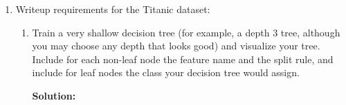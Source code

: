 \documentclass{article}
\newcommand{\solution}{\textbf{Solution: }}
\begin{document}
\begin{enumerate}
\begin{enumerate}
        \item Do 4b, but for the census dataset
        \begin{mdframed}\solution
        \end{mdframed}

        \item Do 4c, but for the census dataset
        \begin{mdframed}\solution
        \end{mdframed}

        \item Generate a random 80/20 training/validation split. Train decision trees with varying maximum depths (try going from depth = 1 to depth = 40) with all other hyperparameters fixed. Plot your validation accuracies. Which depth had the highest validation accuracy? Write 1-2 sentences explaining the behavior you observe in your plot. If you find that you need to plot more depths, feel free to do so.
        \begin{mdframed}\solution
        \end{mdframed}

    \end{enumerate}

    \item Writeup requirements for the Titanic dataset:
    \begin{enumerate}
        \item Train a very shallow decision tree (for example, a depth 3 tree, although you may choose any depth that looks good) and visualize your tree. Include for each non-leaf node the feature name and the split rule, and include for leaf nodes the class your decision tree would assign.
        \begin{mdframed}\solution
        \end{mdframed}
    \end{enumerate}
\end{enumerate}
\end{document}
